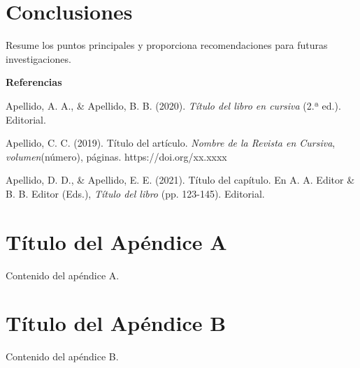 \documentclass[12pt, letterpaper]{article}
\begin{document}
\section{Conclusiones}

Resume los puntos principales y proporciona recomendaciones para futuras investigaciones.

\newpage
\begin{center}
    \textbf{Referencias}
\end{center}

\vspace{0.5cm}


\noindent
\hangindent=1.27cm
Apellido, A. A., \& Apellido, B. B. (2020). \textit{Título del libro en cursiva} (2.ª ed.). Editorial.

\vspace{6pt}
\noindent
\hangindent=1.27cm
Apellido, C. C. (2019). Título del artículo. \textit{Nombre de la Revista en Cursiva}, \textit{volumen}(número), páginas. https://doi.org/xx.xxxx

\vspace{6pt}
\noindent
\hangindent=1.27cm
Apellido, D. D., \& Apellido, E. E. (2021). Título del capítulo. En A. A. Editor \& B. B. Editor (Eds.), \textit{Título del libro} (pp. 123-145). Editorial.

\newpage
\begin{appendices}

\section{Título del Apéndice A}

Contenido del apéndice A.

\section{Título del Apéndice B}

Contenido del apéndice B.

\end{appendices}
\end{document}
